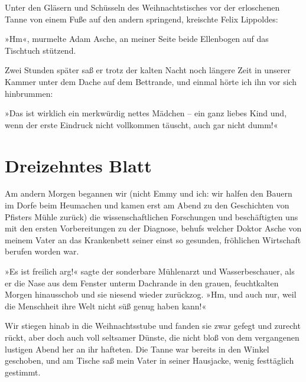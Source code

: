 Unter den Gläsern und Schüsseln des Weihnachtstisches vor der
erloschenen Tanne von einem Fuße auf den andern springend,
kreischte Felix Lippoldes:

»Hm«, murmelte Adam Asche, an meiner Seite beide Ellenbogen auf das
Tischtuch stützend.

Zwei Stunden später saß er trotz der kalten Nacht noch längere Zeit
in unserer Kammer unter dem Dache auf dem Bettrande, und einmal
hörte ich ihn vor sich hinbrummen:

»Das ist wirklich ein merkwürdig nettes Mädchen – ein ganz liebes
Kind und, wenn der erste Eindruck nicht vollkommen täuscht, auch
gar nicht dumm!«

\section{Dreizehntes Blatt}

Am andern Morgen begannen wir (nicht Emmy und ich: wir halfen den
Bauern im Dorfe beim Heumachen und kamen erst am Abend zu den
Geschichten von Pfisters Mühle zurück) die wissenschaftlichen
Forschungen und beschäftigten uns mit den ersten Vorbereitungen zu
der Diagnose, behufs welcher Doktor Asche von meinem Vater an das
Krankenbett seiner einst so gesunden, fröhlichen Wirtschaft berufen
worden war.

»Es ist freilich arg!« sagte der sonderbare Mühlenarzt und
Wasserbeschauer, als er die Nase aus dem Fenster unterm Dachrande
in den grauen, feuchtkalten Morgen hinausschob und sie niesend
wieder zurückzog. »Hm, und auch nur, weil die Menschheit ihre Welt
nicht süß genug haben kann!«

Wir stiegen hinab in die Weihnachtsstube und fanden sie zwar gefegt
und zurecht rückt, aber doch auch voll seltsamer Dünste, die nicht
bloß von dem vergangenen lustigen Abend her an ihr hafteten. Die
Tanne war bereits in den Winkel geschoben, und am Tische saß mein
Vater in seiner Hausjacke, wenig festtäglich gestimmt.

